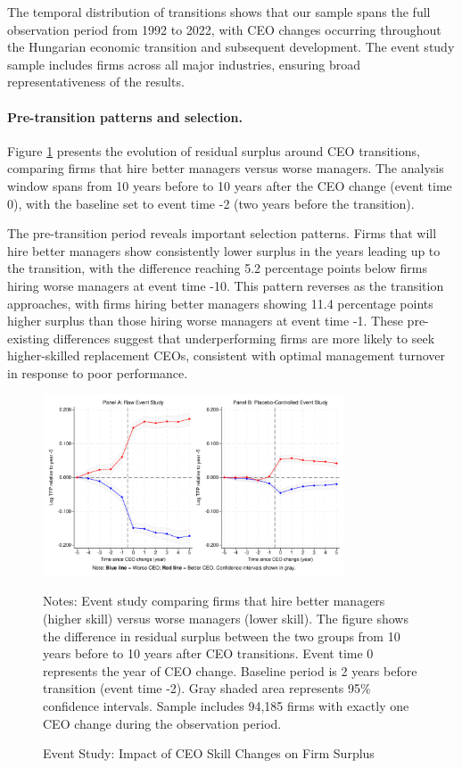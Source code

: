 \documentclass[11pt,a4paper]{article}
\begin{document}
The temporal distribution of transitions shows that our sample spans the full observation period from 1992 to 2022, with CEO changes occurring throughout the Hungarian economic transition and subsequent development. The event study sample includes firms across all major industries, ensuring broad representativeness of the results.

\paragraph{Pre-transition patterns and selection.} Figure \ref{fig:event_study} presents the evolution of residual surplus around CEO transitions, comparing firms that hire better managers versus worse managers. The analysis window spans from 10 years before to 10 years after the CEO change (event time 0), with the baseline set to event time -2 (two years before the transition).

The pre-transition period reveals important selection patterns. Firms that will hire better managers show consistently lower surplus in the years leading up to the transition, with the difference reaching 5.2 percentage points below firms hiring worse managers at event time -10. This pattern reverses as the transition approaches, with firms hiring better managers showing 11.4 percentage points higher surplus than those hiring worse managers at event time -1. These pre-existing differences suggest that underperforming firms are more likely to seek higher-skilled replacement CEOs, consistent with optimal management turnover in response to poor performance.

\begin{figure}[htbp]
\centering
\includegraphics[width=0.8\textwidth]{figure/event_study.pdf}
\caption{Event Study: Impact of CEO Skill Changes on Firm Surplus}
\label{fig:event_study}
\footnotesize
Notes: Event study comparing firms that hire better managers (higher skill) versus worse managers (lower skill). The figure shows the difference in residual surplus between the two groups from 10 years before to 10 years after CEO transitions. Event time 0 represents the year of CEO change. Baseline period is 2 years before transition (event time -2). Gray shaded area represents 95\% confidence intervals. Sample includes 94,185 firms with exactly one CEO change during the observation period.
\end{figure}
\end{document}
